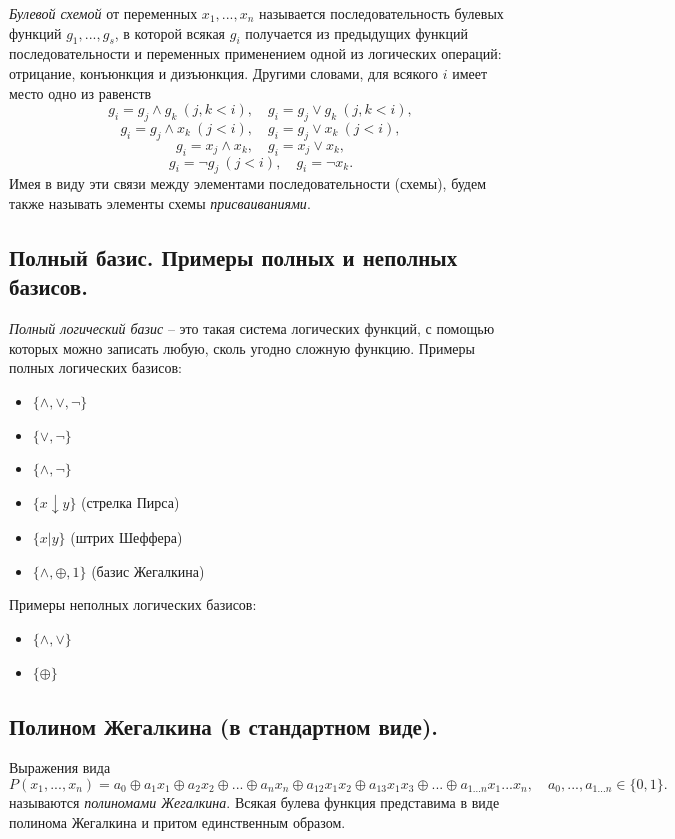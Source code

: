 \documentclass{article}
\begin{document}
\textit{Булевой схемой} от переменных $x_1, ..., x_n$ называется последовательность булевых функций $g_1,...,g_s$, в которой всякая $g_i$ получается из предыдущих функций последовательности и переменных применением одной из логических операций: отрицание, конъюнкция и дизъюнкция. Другими словами, для всякого $i$ имеет место одно из равенств
\[
g_i = g_j \wedge g_k \> (j, k < i),
\quad
g_i = g_j \vee g_k \> (j,k < i),
\]
\[
g_i = g_j \wedge x_k \> (j < i),
\quad
g_i = g_j \vee x_k \> (j < i),
\]
\[
g_i = x_j \wedge x_k,
\quad
g_i = x_j \vee x_k,
\]
\[
g_i = \neg g_j \> (j < i),
\quad
g_i = \neg x_k.
\]
Имея в виду эти связи между элементами последовательности (схемы), будем также называть элементы схемы \textit{присваиваниями}.
\newpage

\subsection{Полный базис. Примеры полных и неполных базисов.}
\textit{Полный логический базис} -- это такая система логических функций, с помощью которых можно записать любую, сколь угодно сложную функцию. 
\newline
Примеры полных логических базисов:
\begin{itemize}
    \item $\{\wedge, \vee, \neg\}$
    \item $\{\vee, \neg\}$
    \item $\{\wedge, \neg\}$
    \item $\{x \downarrow y\}$ (стрелка Пирса)
    \item $\{x | y\}$ (штрих Шеффера)
    \item $\{\wedge, \oplus, 1 \}$ (базис Жегалкина)
\end{itemize}
Примеры неполных логических базисов:
\begin{itemize}
    \item $\{\wedge, \vee\}$
    \item $\{\oplus \}$
\end{itemize}




\subsection{Полином Жегалкина (в стандартном виде).}
Выражения вида
\[
P(x_1,...,x_n) = a_0 \oplus a_1x_1 \oplus a_2x_2 \oplus ... \oplus a_nx_n \oplus a_{12}x_1x_2 \oplus a_{13}x_1x_3 \oplus ... \oplus a_{1...n}x_1...x_n,
\quad
a_0,...,a_{1...n} \in \{0,1\}.
\]
называются \textit{полиномами Жегалкина}.
\newline
\newline
Всякая булева функция представима в виде полинома Жегалкина и притом единственным образом.
\end{document}
